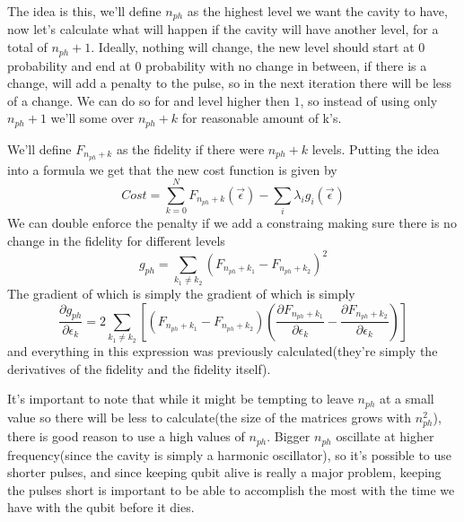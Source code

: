 \documentclass[english, a4paper, 12pt, twoside]{article}
\numberwithin{equation}{section} %
\begin{document}
The idea is this, we'll define $n_{ph}$ as the highest level we want the cavity to have, now let's calculate what will happen if the cavity will have another level, for a total of $n_{ph} + 1$. Ideally, nothing will change, the new level should start at 0 probability and end at 0 probability with no change in between, if there is a change, will add a penalty to the pulse, so in the next iteration there will be less of a change. We can do so for and level higher then $1$, so instead of using only $n_{ph} + 1$ we'll some over $n_{ph} + k$ for reasonable amount of k's.

We'll define $F_{n_{ph} + k}$ as the fidelity if there were $n_{ph} + k$ levels. Putting the idea into a formula we get that the new cost function is given by
\[
    Cost = \sum_{k=0}^{N} F_{n_{ph} + k} (\vec{\epsilon}) - \sum_i \lambda_i g_i (\vec{\epsilon})
\]
We can double enforce the penalty if we add a constraing making sure there is no change in the fidelity for different levels
\[
    g_{ph} = \sum_{k_1 \ne k_2} (F_{n_{ph} + k_1} - F_{n_{ph} + k_2})^2
\]
The gradient of which is simply the gradient of which is simply
\[
    \frac{\partial g_{ph}}{\partial \epsilon_k} = 2 \sum_{k_1 \ne k_2} [(F_{n_{ph} + k_1} - F_{n_{ph} + k_2})(\frac{\partial F_{n_{ph} + k_1}}{\partial \epsilon_k} - \frac{\partial F_{n_{ph} + k_2}}{\partial \epsilon_k})]
\]
and everything in this expression was previously calculated(they're simply the derivatives of the fidelity and the fidelity itself).

It's important to note that while it might be tempting to leave $n_{ph}$ at a small value so there will be less to calculate(the size of the matrices grows with $n_{ph}^2$), there is good reason to use a high values of $n_{ph}$. Bigger $n_{ph}$ oscillate at higher frequency(since the cavity is simply a harmonic oscillator), so it's possible to use shorter pulses, and since keeping qubit alive is really a major problem, keeping the pulses short is important to be able to accomplish the most with the time we have with the qubit before it dies.
\end{document}
